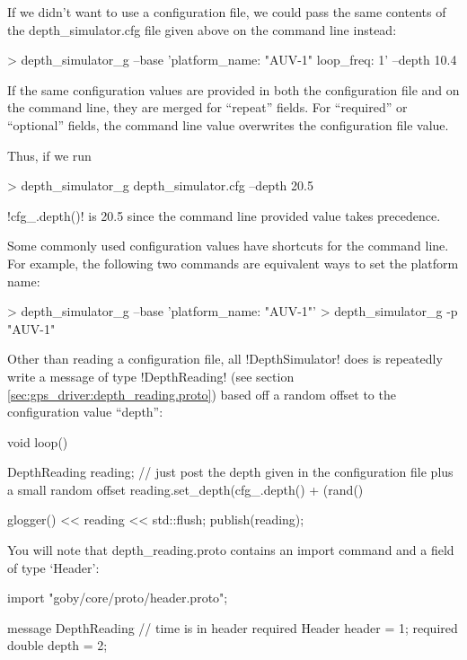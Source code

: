 If we didn't want to use a configuration file, we could pass the same contents of the depth\_simulator.cfg file given above on the command line instead:
\begin{boxedverbatim}
> depth_simulator_g --base 'platform_name: "AUV-1" loop_freq: 1' --depth 10.4
\end{boxedverbatim}
\resetbvlinenumber

If the same configuration values are provided in both the configuration file and on the command line, they are merged for ``repeat'' fields. For ``required'' or ``optional'' fields, the command line value overwrites the configuration file value. 

Thus, if we run
\begin{boxedverbatim}
> depth_simulator_g depth_simulator.cfg --depth 20.5
\end{boxedverbatim}
\resetbvlinenumber
!cfg_.depth()! is 20.5 since the command line provided value takes precedence.

Some commonly used configuration values have shortcuts for the command line. For example, the following two commands are equivalent ways to set the platform name:
\begin{boxedverbatim}
> depth_simulator_g --base 'platform_name: "AUV-1"'
> depth_simulator_g -p "AUV-1"
\end{boxedverbatim}
\resetbvlinenumber

Other than reading a configuration file, all !DepthSimulator! does is repeatedly write a message of type !DepthReading! (see section \ref{sec:gps_driver:depth_reading.proto}) based off a random offset to the configuration value ``depth'':
\begin{boxedverbatim}
void loop()
    {
       DepthReading reading;
       // just post the depth given in the configuration file plus a small random offset
       reading.set_depth(cfg_.depth() + (rand() %

       glogger() << reading << std::flush;
       publish(reading);    
    }
\end{boxedverbatim}
\resetbvlinenumber

You will note that depth\_reading.proto contains an import command and a field of type `Header':
\begin{boxedverbatim}
import "goby/core/proto/header.proto";

message DepthReading
{
  // time is in header
  required Header header = 1;
  required double depth = 2;
}
\end{boxedverbatim}
\resetbvlinenumber

